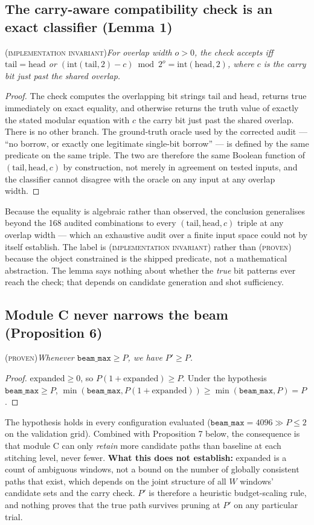 \documentclass[final,5p,times,longtitle]{elsarticle}
\theoremstyle{plain}
\newcommand{\PROVEN}{\textsc{(proven)}}
\newcommand{\INVAR}{\textsc{(implementation invariant)}}
\newcommand{\beammax}{\texttt{beam\_max}}
\begin{document}
\subsection{The carry-aware compatibility check is an exact classifier (Lemma 1)}
\INVAR{}\quad\textit{For overlap width $o>0$, the check accepts iff
$\mathrm{tail}=\mathrm{head}$ or
$(\mathrm{int}(\mathrm{tail},2)-c)\bmod 2^{o}=\mathrm{int}(\mathrm{head},2)$,
where $c$ is the carry bit just past the shared overlap.}

\begin{proof}
The check computes the overlapping bit strings $\mathrm{tail}$ and
$\mathrm{head}$, returns true immediately on exact equality, and
otherwise returns the truth value of exactly the stated modular equation
with $c$ the carry bit just past the shared overlap. There is no other
branch. The ground-truth oracle used by the corrected audit --- ``no
borrow, or exactly one legitimate single-bit borrow'' --- is defined by
the same predicate on the same triple. The two are therefore the same
Boolean function of $(\mathrm{tail},\mathrm{head},c)$ by construction,
not merely in agreement on tested inputs, and the classifier cannot
disagree with the oracle on any input at any overlap width.
\end{proof}

\noindent
Because the equality is algebraic rather than observed, the conclusion
generalises beyond the 168 audited combinations to every
$(\mathrm{tail},\mathrm{head},c)$ triple at any overlap width --- which an
exhaustive audit over a finite input space could not by itself establish.
The label is \INVAR{} rather than \PROVEN{} because the object
constrained is the shipped predicate, not a mathematical abstraction. The
lemma says nothing about whether the \emph{true} bit patterns ever reach
the check; that depends on candidate generation and shot sufficiency.

\subsection{Module C never narrows the beam (Proposition 6)}
\PROVEN{}\quad\textit{Whenever $\beammax\ge P$, we have $P'\ge P$.}

\begin{proof}
$\mathrm{expanded}\ge0$, so $P(1+\mathrm{expanded})\ge P$. Under the
hypothesis $\beammax\ge P$,
$\min(\beammax,P(1+\mathrm{expanded}))\ge\min(\beammax,P)=P$.
\end{proof}

\noindent
The hypothesis holds in every configuration evaluated
($\beammax=4096\gg P\le2$ on the validation grid). Combined with
Proposition 7 below, the consequence is that module C can only
\emph{retain} more candidate paths than baseline at each stitching level,
never fewer. \textbf{What this does not establish:} $\mathrm{expanded}$
is a count of ambiguous windows, not a bound on the number of
globally consistent paths that exist, which depends on the joint
structure of all $W$ windows' candidate sets and the carry check. $P'$ is
therefore a heuristic budget-scaling rule, and nothing proves that the
true path survives pruning at $P'$ on any particular trial.
\end{document}
